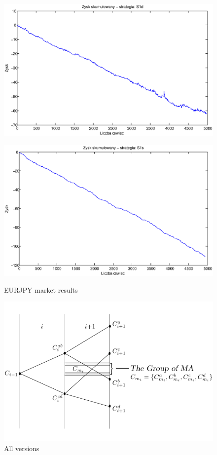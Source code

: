 \documentclass{tewiart}
\begin{document}
\begin{figure}[h]
\begin{minipage}{.49\linewidth}
\label{cztero}
\end{minipage}
\begin{minipage}{.49\linewidth}
\centering 
\includegraphics[width=\textwidth]{S1d.eps}
\label{mansard}
\end{minipage}
\begin{minipage}{\linewidth}
\centering 
\includegraphics[width=\textwidth]{S1s.eps}
\label{mansard}
\end{minipage}
\caption{EURJPY market results}
\end{figure}
\FloatBarrier

\begin{figure}[h]
\centering
\centering 
\includegraphics[width=\textwidth]{rysunek1pp.png}
\caption{All versions}
\end{figure}
\FloatBarrier
\end{document}
